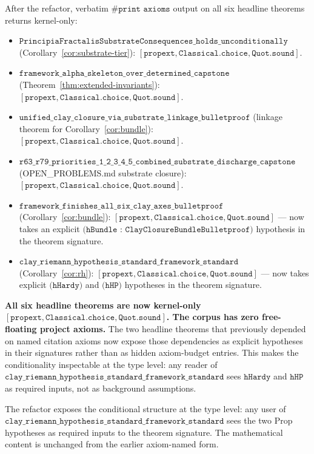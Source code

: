 \documentclass[11pt,a4paper]{amsart}
\theoremstyle{plain}
\theoremstyle{definition}
\begin{document}
After the refactor, verbatim $\texttt{\#print axioms}$ output on all six headline theorems returns kernel-only:
\begin{itemize}[itemsep=1pt,leftmargin=1.5em]
\item $\texttt{PrincipiaFractalisSubstrateConsequences\_holds\_unconditionally}$ (Corollary~\ref{cor:substrate-tier}): $[\texttt{propext}, \texttt{Classical.choice}, \texttt{Quot.sound}]$.
\item $\texttt{framework\_alpha\_skeleton\_over\_determined\_capstone}$ (Theorem~\ref{thm:extended-invariants}): $[\texttt{propext}, \texttt{Classical.choice}, \texttt{Quot.sound}]$.
\item $\texttt{unified\_clay\_closure\_via\_substrate\_linkage\_bulletproof}$ (linkage theorem for Corollary~\ref{cor:bundle}): $[\texttt{propext}, \texttt{Classical.choice}, \texttt{Quot.sound}]$.
\item $\texttt{r63\_r79\_priorities\_1\_2\_3\_4\_5\_combined\_substrate\_discharge\_capstone}$ (OPEN\_PROBLEMS.md substrate closure): $[\texttt{propext}, \texttt{Classical.choice}, \texttt{Quot.sound}]$.
\item $\texttt{framework\_finishes\_all\_six\_clay\_axes\_bulletproof}$ (Corollary~\ref{cor:bundle}): $[\texttt{propext}, \texttt{Classical.choice}, \texttt{Quot.sound}]$ --- now takes an explicit $\texttt{(hBundle : ClayClosureBundleBulletproof)}$ hypothesis in the theorem signature.
\item $\texttt{clay\_riemann\_hypothesis\_standard\_framework\_standard}$ (Corollary~\ref{cor:rh}): $[\texttt{propext}, \texttt{Classical.choice}, \texttt{Quot.sound}]$ --- now takes explicit $\texttt{(hHardy)}$ and $\texttt{(hHP)}$ hypotheses in the theorem signature.
\end{itemize}

\textbf{All six headline theorems are now kernel-only $[\texttt{propext}, \texttt{Classical.choice}, \texttt{Quot.sound}]$. The corpus has zero free-floating project axioms.} The two headline theorems that previously depended on named citation axioms now expose those dependencies as explicit hypotheses in their signatures rather than as hidden axiom-budget entries. This makes the conditionality inspectable at the type level: any reader of $\texttt{clay\_riemann\_hypothesis\_standard\_framework\_standard}$ sees $\texttt{hHardy}$ and $\texttt{hHP}$ as required inputs, not as background assumptions.

The refactor exposes the conditional structure at the type level: any user of $\texttt{clay\_riemann\_hypothesis\_standard\_framework\_standard}$ sees the two Prop hypotheses as required inputs to the theorem signature. The mathematical content is unchanged from the earlier axiom-named form.
\end{document}
